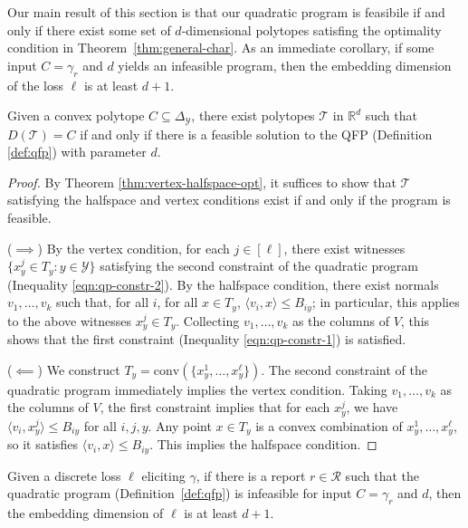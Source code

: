\documentclass[anon]{colt2020} %
\newcommand{\reals}{\mathbb{R}}
\newcommand{\simplex}{\Delta_\Y}
\newcommand{\R}{\mathcal{R}}
\newcommand{\T}{\mathcal{T}}
\newcommand{\Y}{\mathcal{Y}}
\newcommand{\inprod}[2]{\langle #1, #2 \rangle}%
\newcommand{\conv}{\mathrm{conv}}
\DeclareMathOperator*{\argmin}{arg\,min}
\begin{document}
Our main result of this section is that our quadratic program is feasibile if and only if there exist some set of $d$-dimensional polytopes satisfing the optimality condition in Theorem~\ref{thm:general-char}.
As an immediate corollary, if some input $C=\gamma_r$ and $d$ yields an infeasible program, then the embedding dimension of the loss $\ell$ is at least $d+1$.
\begin{theorem} \label{thm:opt-iff-qfp}
  Given a convex polytope $C \subseteq \simplex$, there exist polytopes $\T$ in $\reals^d$ such that $D(\T) = C$ if and only if there is a feasible solution to the QFP (Definition \ref{def:qfp}) with parameter $d$.
\end{theorem}
\begin{proof}
    By Theorem \ref{thm:vertex-halfspace-opt}, it suffices to show that $\T$ satisfying the halfspace and vertex conditions exist if and only if the program is feasible.

  ($\implies$)
  By the vertex condition, for each $j \in [\ell]$, there exist witnesses $\{x^j_y \in T_y : y \in \Y\}$ satisfying the second constraint of the quadratic program (Inequality \ref{eqn:qp-constr-2}).
  By the halfspace condition, there exist normals $v_1, \dots, v_k$ such that, for all $i$, for all $x \in T_y$, $\inprod{v_i}{x} \leq B_{iy}$; in particular, this applies to the above witnesses $x^j_y \in T_y$.
  Collecting $v_1,\dots,v_k$ as the columns of $V$, this shows that the first constraint (Inequality \ref{eqn:qp-constr-1}) is satisfied.

  ($\impliedby$)
  We construct $T_y = \conv(\{x^1_y, \ldots, x^{\ell}_y\})$.
  The second constraint of the quadratic program immediately implies the vertex condition.
  Taking $v_1,\dots,v_k$ as the columns of $V$, the first constraint implies that for each $x^j_y$, we have $\inprod{v_i}{x^j_y} \leq B_{iy}$ for all $i,j,y$.
  Any point $x \in T_y$ is a convex combination of $x^1_y,\ldots,x^{\ell}_y$, so it satisfies $\inprod{v_i}{x} \leq B_{iy}$.
  This implies the halfspace condition.  %
\end{proof}

\begin{corollary}\label{cor:d-embeddable-char}
  Given a discrete loss $\ell$ eliciting $\gamma$, if there is a report $r\in\R$ such that the quadratic program (Definition~\ref{def:qfp}) is infeasible for input $C = \gamma_r$ and $d$, then the embedding dimension of $\ell$ is at least $d+1$.
\end{corollary}
\end{document}

